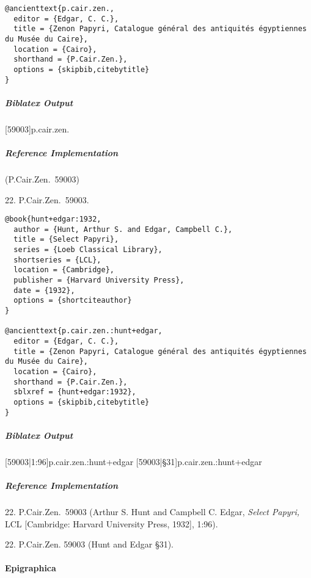 \documentclass[a4paper]{article}
\newenvironment{biboutput}{%
  \subparagraph{Biblatex Output}
}{\color{black}}
\newenvironment{refimp}{%
  \subparagraph{Reference Implementation}
  \color{reference-colour}
  \rm
}{\par\color{black}}
\begin{document}
\begin{lstlisting}
@ancienttext{p.cair.zen.,
  editor = {Edgar, C. C.},
  title = {Zenon Papyri, Catalogue général des antiquités égyptiennes du Musée du Caire},
  location = {Cairo},
  shorthand = {P.Cair.Zen.},
  options = {skipbib,citebytitle}
}
\end{lstlisting}

\begin{biboutput}
  [59003]{p.cair.zen.}
\end{biboutput}

\begin{refimp}
  (P.Cair.Zen.\ 59003)

  22. P.Cair.Zen.\ 59003.
\end{refimp}

\medskip

\begin{lstlisting}
@book{hunt+edgar:1932,
  author = {Hunt, Arthur S. and Edgar, Campbell C.},
  title = {Select Papyri},
  series = {Loeb Classical Library},
  shortseries = {LCL},
  location = {Cambridge},
  publisher = {Harvard University Press},
  date = {1932},
  options = {shortciteauthor}
}

@ancienttext{p.cair.zen.:hunt+edgar,
  editor = {Edgar, C. C.},
  title = {Zenon Papyri, Catalogue général des antiquités égyptiennes du Musée du Caire},
  location = {Cairo},
  shorthand = {P.Cair.Zen.},
  sblxref = {hunt+edgar:1932},
  options = {skipbib,citebytitle}
}
\end{lstlisting}

\begin{biboutput}
  [59003|1:96]{p.cair.zen.:hunt+edgar}
  [59003|§31]{p.cair.zen.:hunt+edgar}
\end{biboutput}

\begin{refimp}
  22. P.Cair.Zen.\ 59003 (Arthur S. Hunt and Campbell C. Edgar, \emph{Select
  Papyri,} LCL [Cambridge: Harvard University Press, 1932], 1:96).

  22. P.Cair.Zen. 59003 (Hunt and Edgar §31).

\end{refimp}

\paragraph{Epigraphica}
\end{document}
